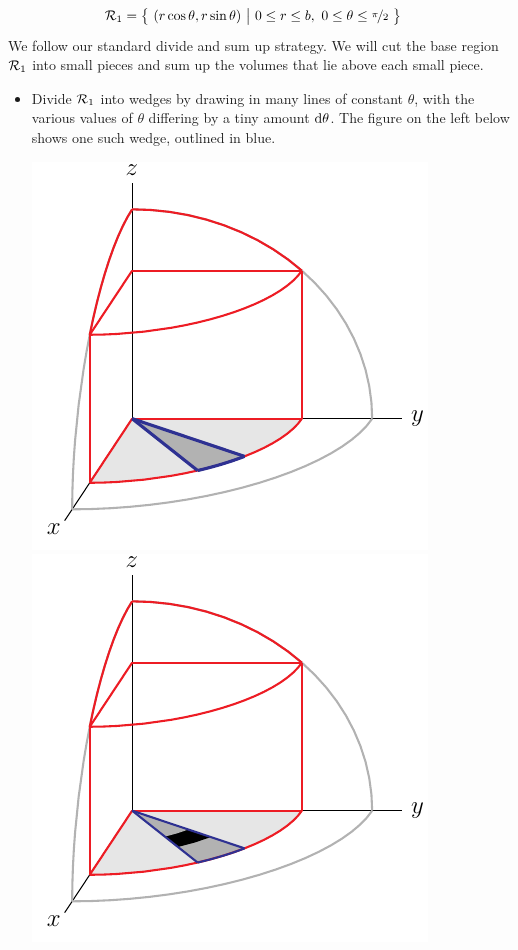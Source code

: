 \begin{eg}
\begin{align*}
\mathcal{R}_1 &= \big\{ \ (r\cos\theta,r\sin\theta)\ \big|\ 0\le r\le b,\  
                    0\le\theta\le\nicefrac{\pi}{2}\ \big\}
\end{align*}
We follow our standard divide and sum up strategy. We will cut the
base region $\mathcal{R}_1$ into small pieces and sum up the volumes that 
lie above each small piece.
\begin{itemize}
\item
Divide $\mathcal{R}_1$ into wedges by drawing in many lines of constant 
$\theta$, with the various values of $\theta$ differing by a tiny 
amount $\mathrm{d}\theta$. The figure on the left below shows one such wedge, 
outlined in blue.
\begin{efig}
\begin{center}
    \includegraphics[scale=0.9]{appleCore1.pdf}\quad
    \includegraphics[scale=0.9]{appleCore2.pdf}
\end{center}
\end{efig}


\end{itemize}
\end{eg}
